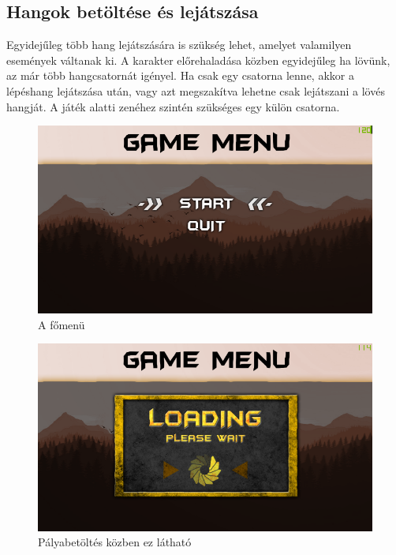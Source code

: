 \subsection{Hangok betöltése és lejátszása}

Egyidejűleg több hang lejátszására is szükség lehet, amelyet valamilyen események váltanak ki. A karakter előrehaladása közben egyidejűleg ha lövünk, az már több hangcsatornát igényel. Ha csak egy csatorna lenne, akkor a lépéshang lejátszása után, vagy azt megszakítva lehetne csak lejátszani a lövés hangját. A játék alatti zenéhez szintén szükséges egy külön csatorna.

\begin{figure}[h]
\centering
\includegraphics[scale=1.6]{kepek/menu.png}
\caption{A főmenü}
\label{fig:menu}
\end{figure}

\begin{figure}[h]
\centering
\includegraphics[scale=1.6]{kepek/loading_screen.png}
\caption{Pályabetöltés közben ez látható}
\label{fig:loading}
\end{figure}

